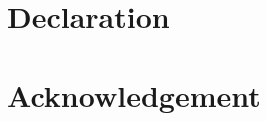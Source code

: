 \documentclass[a4paper,11pt]{report}
\begin{document}
\newpage

\chapter*{Declaration}

\chapter*{Acknowledgement}

\tableofcontents

\listoffigures

\listoftables

\newpage
{}













\printbibliography[title=References]



\printglossaries
\end{document}
